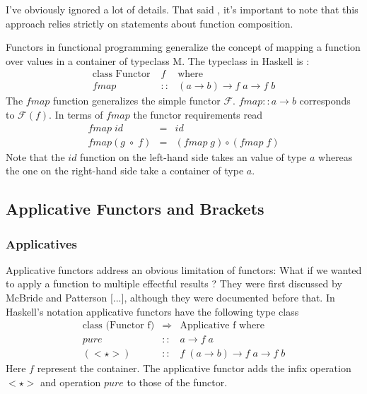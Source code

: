 \documentclass[12pt,fleqn]{article}
\begin{document}
I've obviously ignored a lot of details.
That said , it's important to note that this approach relies strictly on statements about function composition.


Functors in functional programming generalize the concept of mapping a function over values in a container of typeclass M.
The typeclass in Haskell is :
\begin{eqnarray*}
\mbox{class Functor}\; &f& \mbox{where} \\
fmap &::& (a \rightarrow b) \rightarrow f\;a \rightarrow f\;b
\end{eqnarray*}
The $fmap$ function generalizes the simple functor $\mathcal{F}$. 
$fmap::a \rightarrow b$ corresponds to $\mathcal{F}(f)$.
In terms of $fmap$ the functor requirements read 
\begin{eqnarray*}
fmap \; id &=& id  \\
fmap (g \; \circ \; f) &=& (fmap \;g) \circ (fmap \;f) 
\end{eqnarray*}
Note that the $id$ function on the left-hand side takes an value of type $a$ whereas the one on the right-hand side take a container of type $a$.

%
%
%
%
\subsection{Applicative Functors and Brackets}
%
%
%
%
\subsubsection{Applicatives}
\label{subsubsec:applicatives}
%
%
%
Applicative functors address an obvious limitation of functors: What if we wanted to apply a function to multiple effectful results ?
They were first discussed by McBride and Patterson [...], although they were documented before that.
In Haskell's notation applicative functors have the following type class 
\begin{eqnarray*}
\mbox{class (Functor f)} &\Rightarrow& \mbox{Applicative f where} \\
pure  &::& a \rightarrow f\;a \\
(<\star>) &::& f \; ( a \rightarrow b) \rightarrow f \; a \rightarrow f\;b
\end{eqnarray*}
Here $f$ represent the container. 
The applicative functor adds the infix operation $<\star>$ and operation $pure$ to those of the functor.
\end{document}
